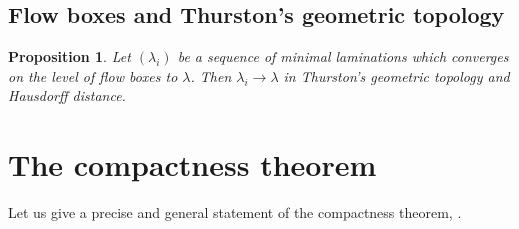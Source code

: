 \documentclass[reqno,10pt]{amsart}
\newtheorem{proposition}[theorem]{Proposition}
\theoremstyle{definition}
\numberwithin{equation}{section}
\begin{document}

\subsection{Flow boxes and Thurston's geometric topology}
\begin{proposition}
Let $(\lambda_i)$ be a sequence of minimal laminations which converges on the level of flow boxes to $\lambda$.
Then $\lambda_i \to \lambda$ in Thurston's geometric topology and Hausdorff distance.
\end{proposition}


\section{The compactness theorem}
Let us give a precise and general statement of the compactness theorem, \cite[Proposition B.1]{ColdingMinicozziIV}.
\end{document}
